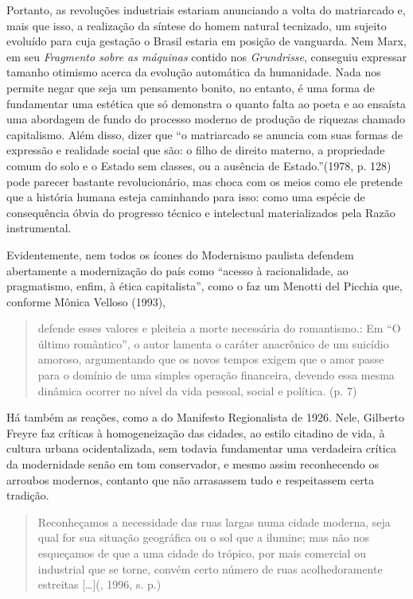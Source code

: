 {Portanto, as revoluções industriais estariam anunciando a volta do
matriarcado e, mais que isso, a realização da síntese do homem natural
tecnizado, um sujeito evoluído para cuja gestação o Brasil estaria em
posição de vanguarda. Nem Marx, em seu \emph{Fragmento sobre as
máquinas} contido nos \emph{Grundrisse}, conseguiu expressar tamanho
otimismo acerca da evolução automática da humanidade. Nada nos permite
negar que seja um pensamento bonito, no entanto, é uma forma de
fundamentar uma estética que só demonstra o quanto falta ao poeta e ao
ensaísta uma abordagem de fundo do processo moderno de produção de
riquezas chamado capitalismo. Além disso, dizer que ``o matriarcado se
anuncia com suas formas de expressão e realidade social que são: o filho
de direito materno, a propriedade comum do solo e o Estado sem classes,
ou a ausência de Estado.''(1978, p. 128) pode parecer bastante
revolucionário, mas choca com os meios como ele pretende que a história
humana esteja caminhando para isso: como uma espécie de consequência
óbvia do progresso técnico e intelectual materializados pela Razão
instrumental.

Evidentemente, nem todos os ícones do Modernismo paulista defendem
abertamente a modernização do país como ``acesso à racionalidade, ao
pragmatismo, enfim, à ética capitalista'', como o faz um Menotti del
Picchia que, conforme Mônica Velloso (1993),

\begin{quote}
defende esses valores e pleiteia a morte necessária do romantismo.: Em
``O último romântico'', o autor lamenta o caráter anacrônico de um
suicídio amoroso, argumentando que os novos tempos exigem que o amor
passe para o domínio de uma simples operação financeira, devendo essa
mesma dinâmica ocorrer no nível da vida pessoal, social e política. (p.
7)
\end{quote}

Há também as reações, como a do Manifesto Regionalista de 1926. Nele,
Gilberto Freyre faz críticas à homogeneização das cidades, ao estilo
citadino de vida, à cultura urbana ocidentalizada, sem todavia
fundamentar uma verdadeira crítica da modernidade senão em tom
conservador, e mesmo assim reconhecendo os arroubos modernos, contanto
que não arrasassem tudo e respeitassem certa tradição.

\begin{quote}
Reconheçamos a necessidade das ruas largas numa cidade moderna, seja
qual for sua situação geográfica ou o sol que a ilumine; mas não nos
esqueçamos de que a uma cidade do trópico, por mais comercial ou
industrial que se torne, convém certo número de ruas acolhedoramente
estreitas [\ldots{}](, 1996, s. p.)
\end{quote}

}
